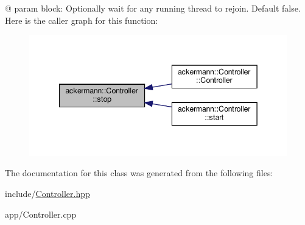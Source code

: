 @ param block\+: Optionally wait for any running thread to rejoin. Default false. Here is the caller graph for this function\+:
\nopagebreak
\begin{figure}[H]
\begin{center}
\leavevmode
\includegraphics[width=342pt]{classackermann_1_1_controller_a285777e5abee8b5ec7eb683410215a04_icgraph}
\end{center}
\end{figure}


The documentation for this class was generated from the following files\+:\begin{DoxyCompactItemize}
\item 
include/\hyperlink{_controller_8hpp}{Controller.\+hpp}\item 
app/Controller.\+cpp\end{DoxyCompactItemize}
